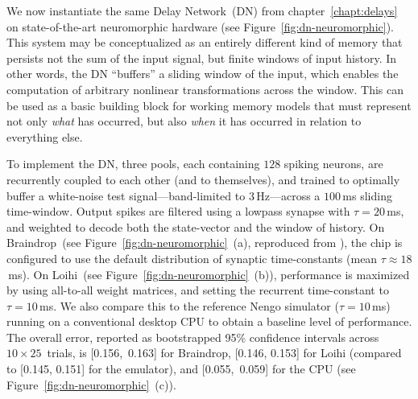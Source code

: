 We now instantiate the same Delay Network~(DN) from chapter~\ref{chapt:delays} on state-of-the-art neuromorphic hardware (see Figure~\ref{fig:dn-neuromorphic}).
This system may be conceptualized as an entirely different kind of memory that persists not the sum of the input signal, but finite windows of input history.
In other words, the DN ``buffers'' a sliding window of the input, which enables the computation of arbitrary nonlinear transformations across the window.
This can be used as a basic building block for working memory models that must represent not only \emph{what} has occurred, but also \emph{when} it has occurred in relation to everything else.

To implement the DN, three pools, each containing $128$ spiking neurons, are recurrently coupled to each other (and to themselves), and trained to optimally buffer a white-noise test signal---band-limited to $3$\,Hz---across a $100$\,ms sliding time-window.
Output spikes are filtered using a lowpass synapse with $\tau = 20$\,ms, and weighted to decode both the state-vector and the window of history.
On Braindrop~(see Figure~\ref{fig:dn-neuromorphic}~(a), reproduced from \citet[][Figure~16]{braindrop2019}), the chip is configured to use the default distribution of synaptic time-constants (mean $\tau \approx 18$\,ms).
On Loihi~(see Figure~\ref{fig:dn-neuromorphic}~(b)), performance is maximized by using all-to-all weight matrices, and setting the recurrent time-constant to $\tau=10$\,ms.
We also compare this to the reference Nengo simulator ($\tau=10$\,ms) running on a conventional desktop CPU to obtain a baseline level of performance.
The overall error, reported as bootstrapped 95\% confidence intervals across $10 \times 25$~trials, is
[0.156,~0.163] for Braindrop,
[0.146, 0.153] for Loihi (compared to [0.145, 0.151] for the emulator), and
[0.055,~0.059] for the CPU (see Figure~\ref{fig:dn-neuromorphic}~(c)).
